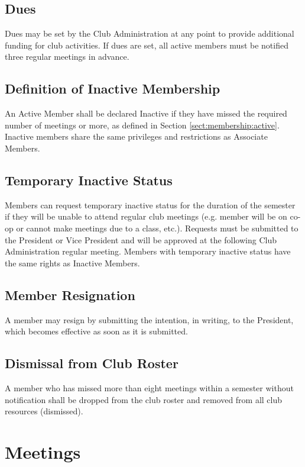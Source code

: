 \documentclass[english,11pt]{article}
\begin{document}
\subsection{Dues} \label{sect:membership:dues}
Dues may be set by the Club Administration at any point to provide additional funding for club activities.
If dues are set, all active members must be notified three regular meetings in advance.

\subsection{Definition of Inactive Membership} \label{sect:membership:inactive}
An Active Member shall be declared Inactive if they have missed the required number of meetings or more, as defined in Section \ref{sect:membership:active}.
Inactive members share the same privileges and restrictions as Associate Members.

\subsection{Temporary Inactive Status} \label{sect:membership:tmp-inactive}
Members can request temporary inactive status for the duration of the semester if they will be unable to attend regular club meetings (e.g. member will be on co-op or cannot make meetings due to a class, etc.).
Requests must be submitted to the President or Vice President and will be approved at the following Club Administration regular meeting.
Members with temporary inactive status have the same rights as Inactive Members.

\subsection{Member Resignation} \label{sect:membership:resignation}
A member may resign by submitting the intention, in writing, to the President, which becomes effective as soon as it is submitted.

\subsection{Dismissal from Club Roster} \label{sect:membership:dismissal}
A member who has missed more than eight meetings within a semester without notification shall be dropped from the club roster and removed from all club resources (dismissed).

\section{Meetings} \label{art:meetings}
\end{document}
